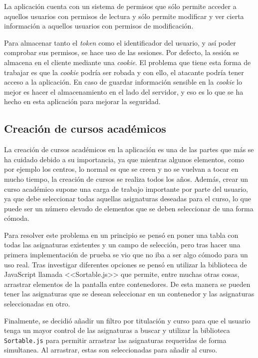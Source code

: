 La aplicación cuenta con un sistema de permisos que sólo permite acceder a aquellos usuarios con permisos de lectura y sólo permite modificar y ver cierta información a aquellos usuarios con permisos de modificación.

Para almacenar tanto el \textit{token} como el identificador del usuario, y así poder comprobar sus permisos, se hace uso de las sesiones.
Por defecto, la sesión se almacena en el cliente mediante una \textit{cookie}. 
El problema que tiene esta forma de trabajar es que la \textit{cookie} podría ser robada y con ello, el atacante podría tener acceso a la aplicación. 
En caso de guardar información sensible en la \textit{cookie} lo mejor es hacer el almacenamiento en el lado del servidor, y eso es lo que se ha hecho en esta aplicación para mejorar la seguridad.

\subsection{Creación de cursos académicos}
La creación de cursos académicos en la aplicación es una de las partes que más se ha cuidado debido a su importancia, ya que mientras algunos elementos, como por ejemplo los centros, lo normal es que se creen y no se vuelvan a tocar en mucho tiempo, la creación de cursos se realiza todos los años.
Además, crear un curso académico supone una carga de trabajo importante por parte del usuario, ya que debe seleccionar todas aquellas asignaturas deseadas para el curso, lo que puede ser un número elevado de elementos que se deben seleccionar de una forma cómoda.

Para resolver este problema en un principio se pensó en poner una tabla con todas las asignaturas existentes y un campo de selección, pero tras hacer una primera implementación de prueba se vio que no iba a ser algo cómodo para un uso real.
Tras investigar diferentes opciones se pensó en utilizar la biblioteca de JavaScript llamada <<Sortable.js>> que permite, entre muchas otras cosas, arrastrar elementos de la pantalla entre contenedores.
De esta manera se pueden tener las asignaturas que se desean seleccionar en un contenedor y las asignaturas seleccionadas en otro.

Finalmente, se decidió añadir un filtro por titulación y curso para que el usuario tenga un mayor control de las asignaturas a buscar y utilizar la biblioteca \texttt{Sortable.js} para permitir arrastrar las asignaturas requeridas de forma simultanea.
Al arrastrar, estas son seleccionadas para añadir al curso.

